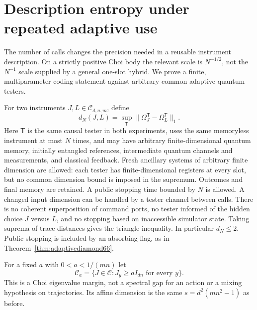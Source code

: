 \section{Description entropy under repeated adaptive use}\label{sec:adaptiveentropy67}
The number of calls changes the precision needed in a reusable
instrument description. On a strictly positive Choi body the relevant
scale is $N^{-1/2}$, not the $N^{-1}$ scale supplied by a general
one-slot hybrid. We prove a finite, multiparameter coding statement
against arbitrary common adaptive quantum testers.

For two instruments $J,L\in\mathcal C_{d,n,m}$, define
\begin{equation}\label{eq:adaptivemetric67}
 d_N(J,L)=\sup_{\mathsf T}
       \|\Omega_J^{\mathsf T}-\Omega_L^{\mathsf T}\|_1.
\end{equation}
Here $\mathsf T$ is the same causal tester in both experiments, uses the
same memoryless instrument at most $N$ times, and may have arbitrary
finite-dimensional quantum memory, initially entangled references,
intermediate quantum channels and measurements, and classical
feedback. Fresh ancillary systems of arbitrary finite dimension are
allowed: each tester has finite-dimensional registers at every slot,
but no common dimension bound is imposed in the supremum.
Outcomes and final memory are retained. A public stopping
time bounded by $N$ is allowed. A changed input dimension can be handled
by a tester channel between calls. There is no coherent superposition
of command ports, no tester informed of the hidden choice $J$ versus
$L$, and no stopping based on inaccessible simulator state. Taking
suprema of trace distances gives the triangle inequality. In
particular $d_N\le2$. Public stopping is included by an absorbing flag,
as in Theorem~\ref{thm:adaptivediamond66}.

For a fixed $a$ with $0<a<1/(mn)$ let
\[
 \mathcal C_a=\{J\in\mathcal C:J_y\ge aI_{dn}\text{ for every }y\}.
\]
This is a Choi eigenvalue margin, not a spectral gap for an action or a
mixing hypothesis on trajectories. Its affine dimension is the same
$s=d^2(mn^2-1)$ as before.

